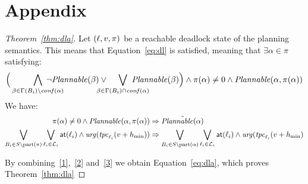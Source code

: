 \section{Appendix}

\begin{proof}[Theorem~\ref{thm:dla}]
  Let $(\ell,v,\pi)$ be a reachable deadlock state of the planning semantics. This 
  means that Equation~\ref{eq:dl} is satisfied, meaning that $\exists\alpha\in\pi$ 
  satisfying:
  \begin{equation}\label{1}
    \Big(\bigwedge_{\beta\in\Gamma(B_i)\setminus\confl(\alpha)}\hspace{-8mm}
    \neg\plntxt{\beta}\vee\hspace{-5mm}\bigvee_{\beta\in\Gamma(B_i)\cap\confl(\alpha)}
    \hspace{-8mm}\plntxt{\beta}\Big)\wedge\pi(\alpha)\neq0\wedge
    \plnIntxt{\alpha}{\pi(\alpha)}
  \end{equation}
  We have:
  \begin{align}
  \pi(\alpha)\neq0\wedge\mathit{Plannable(\alpha,\pi(\alpha))}
  &\Rightarrow\tilde{\mathit{Plannable(\alpha)}}\label{2}\\
  \bigvee_{B_i\in S\setminus\mathrm{part}(\pi)}\bigvee_{\ell_i\in\mathcal{L}_i}\textnormal{\textsf{at}}(\ell_i)\wedge\textnormal{\textit{urg}}(\mathit{tpc}_{\ell_i}(v+h_{\min}))&\Rightarrow\bigvee_{B_i\in S\setminus\mathrm{part}(\alpha)}\bigvee_{\ell_i\in\mathcal{L}_i}\textnormal{\textsf{at}}(\ell_i)\wedge\textnormal{\textit{urg}}(\mathit{tpc}_{\ell_i}(v+h_{\min})\label{3}
   \end{align}
     
   By combining~\ref{1},~\ref{2} and~\ref{3} we obtain Equation~\ref{eq:dla}, which
   proves Theorem~\ref{thm:dla}


\end{proof}
